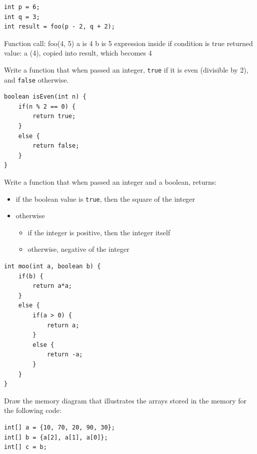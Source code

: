 \begin{questions}
\begin{lstlisting}
int p = 6;
int q = 3;
int result = foo(p - 2, q + 2);
\end{lstlisting}

\begin{solution}
Function call: foo(4, 5)
a is 4
b is 5
expression inside if condition is true
returned value: a (4), copied into result, which becomes 4
\end{solution}

\question Write a function that when passed an integer, \texttt{true} if it is even (divisible by 2), and \texttt{false} otherwise.
\begin{solution}
\begin{lstlisting}
boolean isEven(int n) {
	if(n % 2 == 0) {
		return true;
	}
	else {
		return false;
	}
}
\end{lstlisting}	
\end{solution}

\newpage

\question Write a function that when passed an integer and a boolean, returns:

\begin{itemize}
	\item if the boolean value is \texttt{true}, then the square of the integer
	\item otherwise
			\begin{itemize}
				\item if the integer is positive, then the integer itself
				\item otherwise, negative of the integer
			\end{itemize}
\end{itemize}

\begin{solution}
\begin{lstlisting}
int moo(int a, boolean b) {
	if(b) {
		return a*a;
	}
	else {
		if(a > 0) {
			return a;
		}
		else {
			return -a;
		}
	}
}
\end{lstlisting}
\end{solution}

\question Draw the memory diagram that illustrates the arrays stored in the memory for the following code:

\begin{lstlisting}
int[] a = {10, 70, 20, 90, 30};
int[] b = {a[2], a[1], a[0]};
int[] c = b;
\end{lstlisting}


\end{questions}
